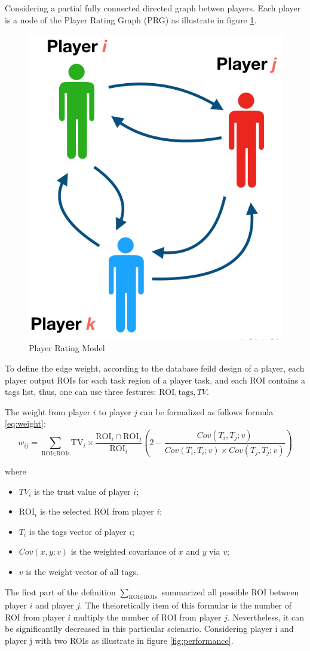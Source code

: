   Considering a partial fully connected directed graph betwen players. 
  Each player is a node of the Player Rating Graph (PRG) as illustrate in figure \ref{fig:graph}.

  \begin{figure}[htp]
  \centering
  \includegraphics[width=0.3\columnwidth]{figures/graph}
  \caption{Player Rating Model}
  \label{fig:graph}
  \end{figure}
  
  To define the edge weight, according to the database feild design of a player, each player
  output ROIs for each task region of a player task, and each ROI contains a tags list, thus, 
  one can use three festures: $\text{ROI}, \text{tags}, TV$.

  \begin{definition}
  The weight from player $i$ to player $j$ can be formalized as follows formula \ref{eq:weight}:
  \begin{equation}
  \label{eq:weight}
  w_{ij} = 
  \sum_{\text{ROI}\in\text{ROIs}}{
    \text{TV}_i \times
    \frac{\text{ROI}_i\cap\text{ROI}_j}{\text{ROI}_i}
    \left( 2-\frac{Cov(T_i, T_j; v)}
        {Cov(T_i, T_i; v)\times Cov(T_j, T_j; v)} \right)
  }
  \end{equation}

  where 
  
  \begin{itemize}
    \item $TV_i$ is the trust value of player $i$;
    \item $\text{ROI}_i$ is the selected ROI from player $i$;
    \item $T_i$ is the tags vector of player $i$;
    \item $Cov(x, y; v)$ is the weighted covariance of $x$ and $y$ via $v$;
    \item $v$ is the weight vector of all tags.
  \end{itemize}
  \end{definition}

  The first part of the definition $\sum_{\text{ROI}\in\text{ROIs}}$ summarized all possible 
  ROI between player $i$ and player $j$. The theioretically item of this formular is the number
  of ROI from player $i$ multiply the number of ROI from player $j$. Nevertheless, it can be
  significantlly decreased in this particular scienario. Considering player i and player j 
  with two ROIs as illustrate in figure \ref{fig:performance}.

